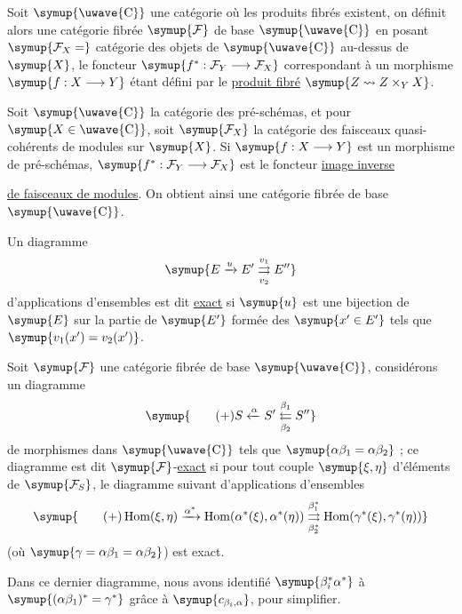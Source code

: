  Soit $\symup{\text{\uwave{C}}}$ une catégorie où les produits fibrés
existent, on définit alors une catégorie fibrée $\symup{\mathcal F}$ de base
$\symup{\text{\uwave{C}}}$ en posant $\symup{\mathcal F_X=}$ catégorie des objets de $\symup{\text{\uwave{C}}}$
au-dessus de $\symup{X}$, le foncteur
$\symup{f^*:\mathcal F_Y\longrightarrow\mathcal F_X}$ correspondant à un morphisme
$\symup{f:X\longrightarrow Y}$ étant défini par le \uline{produit fibré}
$\symup{Z\rightsquigarrow Z\times_YX}$.

 Soit $\symup{\text{\uwave{C}}}$ la catégorie des pré-schémas, et pour
$\symup{X\in\text{\uwave{C}}}$, soit $\symup{\mathcal F_X}$ la catégorie des faisceaux
quasi-cohérents de modules sur $\symup{X}$. Si $\symup{f:X\longrightarrow Y}$ est un morphisme
de pré-schémas, $\symup{f^*:\mathcal F_Y\longrightarrow\mathcal F_X}$ est le foncteur
\uline{image inverse}

\uline{de faisceaux de modules}. On obtient ainsi une catégorie fibrée de base
$\symup{\text{\uwave{C}}}$.

 Un diagramme
\[
  \symup{E\xrightarrow{u}E'
  \overset{v_1}{\underset{v_2}{\rightrightarrows}}E''}
\]
d'applications d'ensembles est dit \uline{exact} si $\symup{u}$ est une bijection de
$\symup{E}$ sur la partie de $\symup{E'}$ formée des $\symup{x'\in E'}$ tels que
$\symup{v_1(x')=v_2(x')}$.

 Soit $\symup{\mathcal F}$ une catégorie fibrée de base
$\symup{\text{\uwave{C}}}$, considérons un diagramme
\[
  \symup{\tag{+}
  S\xleftarrow{\alpha}S'
  \overset{\beta_1}{\underset{\beta_2}{\leftleftarrows}}S''}
\]
de morphismes dans $\symup{\text{\uwave{C}}}$ tels que
$\symup{\alpha\beta_1=\alpha\beta_2}$ ; ce diagramme est dit
$\symup{\mathcal F}$-\uline{exact} si pour tout couple $\symup{\xi,\eta}$ d'éléments de
$\symup{\mathcal F_S}$, le diagramme suivant d'applications d'ensembles
\[
  \symup{\tag{+}
  \operatorname{Hom}(\xi,\eta)
  \xrightarrow{\alpha^*}
  \operatorname{Hom}(\alpha^*(\xi),\alpha^*(\eta))
  \overset{\beta_1^*}{\underset{\beta_2^*}{\rightrightarrows}}
  \operatorname{Hom}(\gamma^*(\xi),\gamma^*(\eta))}
\]
(où $\symup{\gamma=\alpha\beta_1=\alpha\beta_2}$) est exact.

Dans ce dernier
diagramme, nous avons identifié $\symup{\beta_i^*\alpha^*}$ à
$\symup{(\alpha\beta_1)^*=\gamma^*}$ grâce à $\symup{c_{\beta_i,\alpha}}$, pour simplifier.

